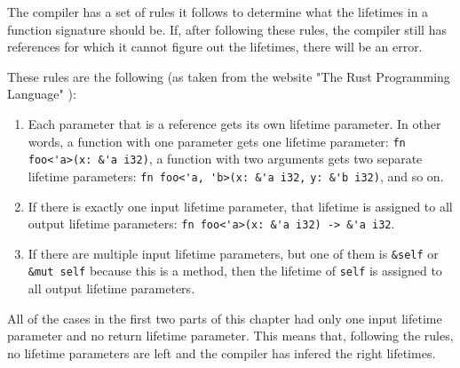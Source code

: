 The compiler has a set of rules it follows to determine what the lifetimes in a function signature should be. If, after following these rules, the compiler still has references for which it cannot figure out the lifetimes, there will be an error. 

These rules are the following (as taken from the website "The Rust Programming Language" \citep{lifetimes}):

\begin{enumerate}[noitemsep]
    \item Each parameter that is a reference gets its own lifetime parameter. In other words, a function with one parameter gets one lifetime parameter: \verb|fn foo<'a>(x: &'a i32)|, a function with two arguments gets two separate lifetime parameters: \verb|fn foo<'a, 'b>(x: &'a i32,| \verb|y: &'b i32)|, and so on.
\item If there is exactly one input lifetime parameter, that lifetime is assigned to all output lifetime parameters: \verb|fn foo<'a>(x: &'a i32) -> &'a i32|.
\item If there are multiple input lifetime parameters, but one of them is \verb|&self| or \verb|&mut self| because this is a method, then the lifetime of \verb|self| is assigned to all output lifetime parameters.
\end{enumerate}

All of the cases in the first two parts of this chapter had only one input lifetime parameter and no return lifetime parameter. This means that, following the rules, no lifetime parameters are left and the compiler has infered the right lifetimes. 



%    

